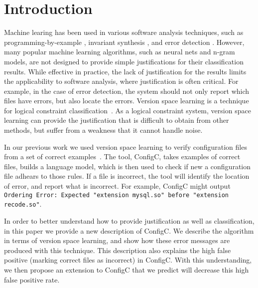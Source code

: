 \section{Introduction}

Machine learing has been used in various software analysis techniques, such as programming-by-example \cite{lau2000version}, invariant synthesis \cite{garg2014ice}, and error detection \cite{Santolucito2016}.
However, many popular machine learning algorithms, such as neural nets and n-gram models, are not designed to provide simple justifications for their classification results.
While effective in practice, the lack of justification for the results limits the applicability to software analysis, where justification is often critical.
For example, in the case of error detection, the system should not only report which files have errors, but also locate the errors.
Version space learning is a technique for logical constraint classification~\cite{mitchell82}.
As a logical constraint system, version space learning can provide the justification that is difficult to obtain from other methods, but suffer from a weakness that it cannot handle noise.


In our previous work we used version space learning to verify configuration files from a set of correct examples~\cite{Santolucito2016}.
The tool, ConfigC, takes examples of correct files, builds a language model, which is then used to check if new a configuration file adhears to those rules.
If a file is incorrect, the tool will identify the location of error, and report what is incorrect.
For example, ConfigC might output \texttt{Ordering Error: Expected "extension mysql.so" before "extension recode.so"}.

In order to better understand how to provide justification as well as classification, in this paper we provide a new description of ConfigC.
We describe the algorithm in terms of version space learning, and show how these error messages are produced with this technique.
This description also explains the high false positive (marking correct files as incorrect) in ConfigC.
With this understanding, we then propose an extension to ConfigC that we predict will decrease this high false positive rate.

